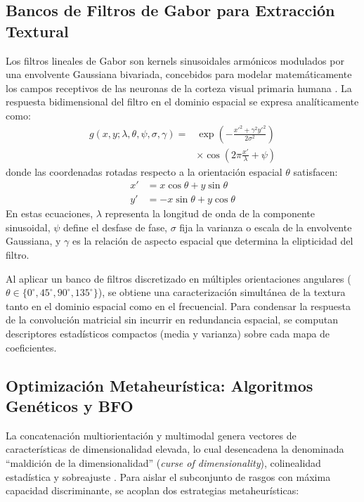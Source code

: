 \subsection{Bancos de Filtros de Gabor para Extracción Textural}
Los filtros lineales de Gabor son kernels sinusoidales armónicos modulados por una envolvente Gaussiana bivariada, concebidos para modelar matemáticamente los campos receptivos de las neuronas de la corteza visual primaria humana \cite{duda2000}. La respuesta bidimensional del filtro en el dominio espacial se expresa analíticamente como:
\begin{equation}
\begin{aligned}
g(x,y;\lambda,\theta,\psi,\sigma,\gamma) = {} & \exp\left(-\frac{x'^2 + \gamma^2 y'^2}{2\sigma^2}\right) \\
& \times \cos\left(2\pi \frac{x'}{\lambda} + \psi\right)
\end{aligned}
\end{equation}
donde las coordenadas rotadas respecto a la orientación espacial $\theta$ satisfacen:
\begin{align}
x' &= x\cos\theta + y\sin\theta \\
y' &= -x\sin\theta + y\cos\theta
\end{align}
En estas ecuaciones, $\lambda$ representa la longitud de onda de la componente sinusoidal, $\psi$ define el desfase de fase, $\sigma$ fija la varianza o escala de la envolvente Gaussiana, y $\gamma$ es la relación de aspecto espacial que determina la elipticidad del filtro. 

Al aplicar un banco de filtros discretizado en múltiples orientaciones angulares ($\theta \in \{0^\circ, 45^\circ, 90^\circ, 135^\circ\}$), se obtiene una caracterización simultánea de la textura tanto en el dominio espacial como en el frecuencial. Para condensar la respuesta de la convolución matricial sin incurrir en redundancia espacial, se computan descriptores estadísticos compactos (media y varianza) sobre cada mapa de coeficientes.

\subsection{Optimización Metaheurística: Algoritmos Genéticos y BFO}
La concatenación multiorientación y multimodal genera vectores de características de dimensionalidad elevada, lo cual desencadena la denominada ``maldición de la dimensionalidad'' (\textit{curse of dimensionality}), colinealidad estadística y sobreajuste \cite{bishop2006}. Para aislar el subconjunto de rasgos con máxima capacidad discriminante, se acoplan dos estrategias metaheurísticas:

